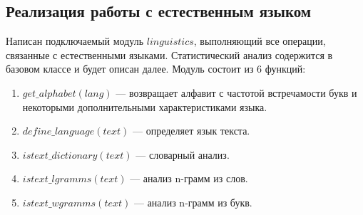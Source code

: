 \subsection{Реализация работы с естественным языком}
Написан подключаемый модуль $linguistics$, выполняющий все операции, 
связанные с естественными языками. Статистический анализ
содержится в базовом классе и будет описан далее.
Модуль состоит из 6 функций:

\begin{enumerate}
\item $get\_alphabet(lang)$ — возвращает алфавит с частотой встречамости 
    букв и некоторыми дополнительными характеристиками языка.
\item $define\_language(text)$ — определяет язык текста.
\item $istext\_dictionary(text)$ — словарный анализ.
\item $istext\_lgramms(text)$ — анализ n-грамм из слов.
\item $istext\_wgramms(text)$ — анализ n-грамм из букв.
\end{enumerate}
